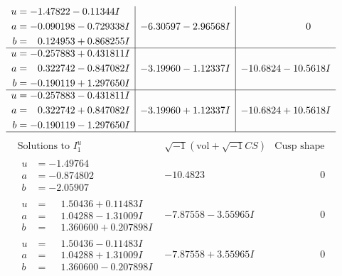 \documentclass[1p]{elsarticle_modified}
\theoremstyle{definition}
\newcommand{\I}{\sqrt{-1}}
\begin{document}
$$\begin{array}{c|c|c}
\begin{aligned}
u &= -1.47822 - 0.11344 I \\
a &= -0.090198 - 0.729338 I \\
b &= \phantom{-}0.124953 + 0.868255 I\end{aligned}
 & -6.30597 - 2.96568 I & \phantom{-0.000000 } 0 \\ \hline\begin{aligned}
u &= -0.257883 + 0.431811 I \\
a &= \phantom{-}0.322742 - 0.847082 I \\
b &= -0.190119 + 1.297650 I\end{aligned}
 & -3.19960 - 1.12337 I & -10.6824 - 10.5618 I \\ \hline\begin{aligned}
u &= -0.257883 - 0.431811 I \\
a &= \phantom{-}0.322742 + 0.847082 I \\
b &= -0.190119 - 1.297650 I\end{aligned}
 & -3.19960 + 1.12337 I & -10.6824 + 10.5618 I\\
 \hline 
 \end{array}$$\newpage$$\begin{array}{c|c|c}  
\text{Solutions to }I^u_{1}& \I (\text{vol} + \sqrt{-1}CS) & \text{Cusp shape}\\
 \hline 
\begin{aligned}
u &= -1.49764\phantom{ +0.000000I} \\
a &= -0.874802\phantom{ +0.000000I} \\
b &= -2.05907\phantom{ +0.000000I}\end{aligned}
 & -10.4823\phantom{ +0.000000I} & \phantom{-0.000000 } 0 \\ \hline\begin{aligned}
u &= \phantom{-}1.50436 + 0.11483 I \\
a &= \phantom{-}1.04288 - 1.31009 I \\
b &= \phantom{-}1.360600 + 0.207898 I\end{aligned}
 & -7.87558 - 3.55965 I & \phantom{-0.000000 } 0 \\ \hline\begin{aligned}
u &= \phantom{-}1.50436 - 0.11483 I \\
a &= \phantom{-}1.04288 + 1.31009 I \\
b &= \phantom{-}1.360600 - 0.207898 I\end{aligned}
 & -7.87558 + 3.55965 I & \phantom{-0.000000 } 0 \\ \hline\begin{aligned}

\end{aligned}
\end{array}$$
\end{document}
